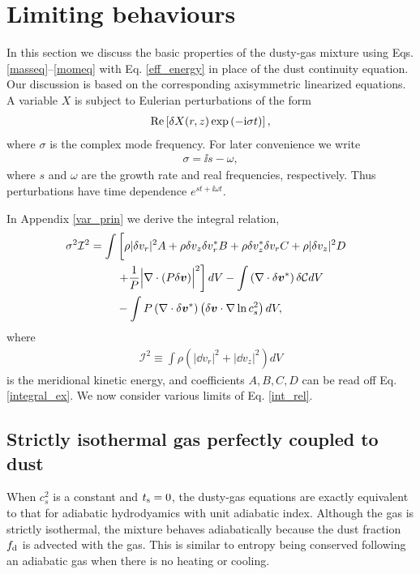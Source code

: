 
\section{Limiting behaviours}\label{limits}

In this section we discuss the basic properties of the 
dusty-gas mixture using Eqs.\ref{masseq}--\ref{momeq} with 
Eq. \ref{eff_energy} in place of the dust continuity equation. Our
discussion is based on the corresponding axisymmetric linearized
equations. A variable $X$ is
subject to Eulerian perturbations of the form 
\begin{align}
 \operatorname{Re}\left[ \delta X(r,z)\exp{\left(-\mathrm{i}\sigma t\right)}\right], 
\end{align}
where $\sigma$ is the complex mode frequency. For later convenience we
write 
\begin{align}
  \sigma = \ii s - \omega,
\end{align}
where $s$ and $\omega$ are the growth rate and real frequencies,
respectively. Thus perturbations have time dependence $e^{st +
  \ii\omega t}$.  

In Appendix
\ref{var_prin} we derive the integral relation,  
\begin{align}
  \sigma^2\mathcal{I}^2
&= \int\left[ \rho
  |\dd v_r|^2A + \rho  \dd v_z \dd v_r^* B + \rho \dd v_z^*\dd v_r C +
  \rho |\dd v_z|^2 D\phantom{\frac{1}{1}}\right. \notag\\
&\phantom{===}  \left. + \frac{1}{P}\Bigl\lvert \nabla\cdot\left(P\dd
  \bm{v}\right)\Bigr\rvert^2\right]dV  -\int \left(\nabla\cdot\dd\bm{v}^*\right)\dd\mathcal{C}dV \notag\\
&\phantom{===}
- \int P
  \left(\nabla\cdot\dd\bm{v}^*\right)\left(\dd\bm{v}\cdot\nabla\ln{c_s^2}\right)dV,\label{int_rel}
\end{align} 
where
\begin{align}
  \mathcal{I}^2 \equiv \int\rho\left(|\dd v_r|^2 + |\dd v_z|^2\right)dV
\end{align}
is the meridional kinetic energy, 
and coefficients $A,B,C,D$ can be
read off Eq. \ref{integral_ex}. %
We now consider various limits of Eq. \ref{int_rel}.    


\subsection{Strictly isothermal gas perfectly coupled to dust}\label{iso_perfect}
When $c_s^2$ is a constant and $t_\mathrm{s}=0$, the dusty-gas equations are
exactly equivalent to that for adiabatic hydrodyamics with unit adiabatic
index. Although the gas is strictly isothermal, the mixture behaves 
adiabatically because the dust fraction $f_\mathrm{d}$ is advected with 
the gas. This is similar to entropy being conserved following an
adiabatic gas when there is no heating or cooling.  

